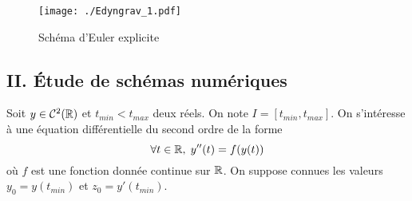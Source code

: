 \begin{figure}[h]
  \centering
  \texttt{[image: ./Edyngrav\_1.pdf]}
  \caption{Schéma d'Euler explicite}
  \label{fig:Edyngrav_1}
\end{figure}


\subsection*{II. \'Etude de schémas numériques}
Soit $y \in \mathcal{C}^2(\mathbb{R})$ et $t_{min} < t_{max}$ deux réels. On note $I = \left[t_{min}, t_{max} \right]$. On s'intéresse à une équation différentielle du second ordre de la forme
\begin{equation}
  \forall t \in \mathbb{R}, \; y''(t) = f(y(t)) \label{eqdif}
\end{equation}
où $f$ est une fonction donnée continue sur $\mathbb{R}$.\newline
On suppose connues les valeurs $y_0=y(t_{min})$ et $z_0=y'(t_{min})$.
